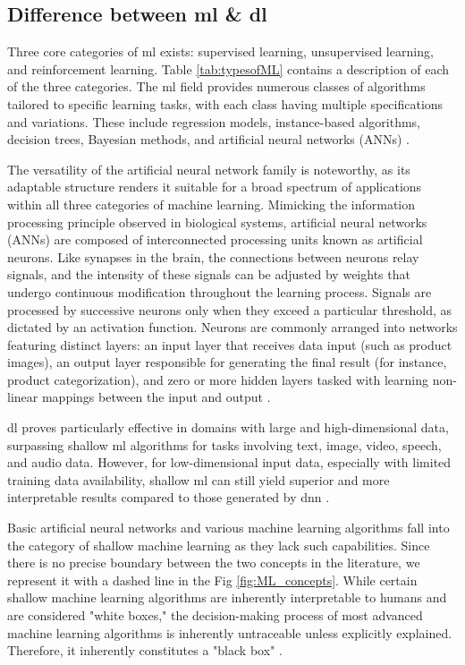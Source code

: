 \subsection{Difference between \acrshort{ml} \& \acrshort{dl}}
Three core categories of \acrshort{ml} exists: supervised learning, unsupervised learning, and reinforcement learning.
Table \ref{tab:typesofML} contains a description of each of the three categories. 
The \acrshort{ml} field provides numerous classes of algorithms tailored to specific learning tasks, with each class having multiple specifications and variations. 
These include regression models, instance-based algorithms, decision trees, Bayesian methods, and artificial neural networks (ANNs) \cite{janiesch2021machine}. 

The versatility of the artificial neural network family is noteworthy, as its adaptable structure renders it suitable for a broad spectrum of applications within all three categories of machine learning. 
Mimicking the information processing principle observed in biological systems, artificial neural networks (ANNs) are composed of interconnected processing units known as artificial neurons. 
Like synapses in the brain, the connections between neurons relay signals, and the intensity of these signals can be adjusted by weights that undergo continuous modification throughout the learning process. 
Signals are processed by successive neurons only when they exceed a particular threshold, as dictated by an activation function. 
Neurons are commonly arranged into networks featuring distinct layers: an input layer that receives data input (such as product images), an output layer responsible for generating the final result (for instance, product categorization), and zero or more hidden layers tasked with learning non-linear mappings between the input and output \cite{janiesch2021machine}.

\acrshort{dl} proves particularly effective in domains with large and high-dimensional data, surpassing shallow \acrshort{ml} algorithms for tasks involving text, image, video, speech, and audio data. However, for low-dimensional input data, especially with limited training data availability, shallow \acrshort{ml} can still yield superior and more interpretable results compared to those generated by \acrfull{dnn} \cite{janiesch2021machine}.

Basic artificial neural networks and various machine learning algorithms fall into the category of shallow machine learning as they lack such capabilities. Since there is no precise boundary between the two concepts in the literature, we represent it with a dashed line in the Fig \ref{fig:ML_concepts}. While certain shallow machine learning algorithms are inherently interpretable to humans and are considered "white boxes," the decision-making process of most advanced machine learning algorithms is inherently untraceable unless explicitly explained. Therefore, it inherently constitutes a "black box" \cite{janiesch2021machine}.

